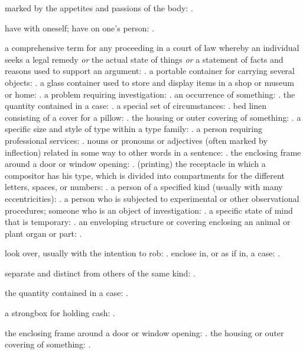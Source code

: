   marked by the appetites and passions of the body: .

  have with oneself; have on one's person: .

  a comprehensive term for any proceeding in a court of law whereby an individual seeks a legal remedy \textit{or} the actual state of things \textit{or} a statement of facts and reasons used to support an argument: . a portable container for carrying several objects: . a glass container used to store and display items in a shop or museum or home: . a problem requiring investigation: . an occurrence of something: . the quantity contained in a case: . a special set of circumstances: . bed linen consisting of a cover for a pillow: . the housing or outer covering of something: . a specific size and style of type within a type family: . a person requiring professional services: . nouns or pronouns or adjectives (often marked by inflection) related in some way to other words in a sentence: . the enclosing frame around a door or window opening: . (printing) the receptacle in which a compositor has his type, which is divided into compartments for the different letters, spaces, or numbers: . a person of a specified kind (usually with many eccentricities): . a person who is subjected to experimental or other observational procedures; someone who is an object of investigation: . a specific state of mind that is temporary: . an enveloping structure or covering enclosing an animal or plant organ or part: .

  look over, usually with the intention to rob: . enclose in, or as if in, a case: .

  separate and distinct from others of the same kind: .

  the quantity contained in a case: .

  a strongbox for holding cash: .

  the enclosing frame around a door or window opening: . the housing or outer covering of something: .

